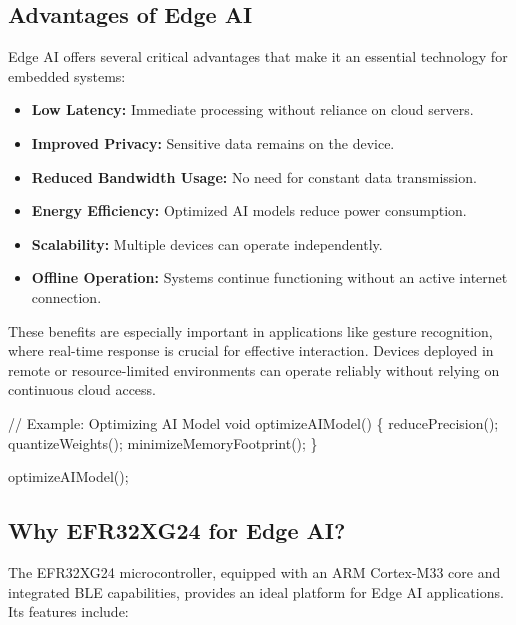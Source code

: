 \documentclass[
  9pt,
  letterpaper,
  abstract,
  titlepage]{scrbook}
\newenvironment{Shaded}{\begin{snugshade}}{\end{snugshade}}
\newcommand{\CommentTok}[1]{\textcolor[rgb]{0.37,0.37,0.37}{#1}}
\newcommand{\DataTypeTok}[1]{\textcolor[rgb]{0.68,0.00,0.00}{#1}}
\newcommand{\NormalTok}[1]{\textcolor[rgb]{0.00,0.23,0.31}{#1}}
\newcommand{\OperatorTok}[1]{\textcolor[rgb]{0.37,0.37,0.37}{#1}}
\begin{document}
\subsection{Advantages of Edge AI}\label{advantages-of-edge-ai}

Edge AI offers several critical advantages that make it an essential
technology for embedded systems:

\begin{itemize}
\item
  \textbf{Low Latency:} Immediate processing without reliance on cloud
  servers.
\item
  \textbf{Improved Privacy:} Sensitive data remains on the device.
\item
  \textbf{Reduced Bandwidth Usage:} No need for constant data
  transmission.
\item
  \textbf{Energy Efficiency:} Optimized AI models reduce power
  consumption.
\item
  \textbf{Scalability:} Multiple devices can operate independently.
\item
  \textbf{Offline Operation:} Systems continue functioning without an
  active internet connection.
\end{itemize}

These benefits are especially important in applications like gesture
recognition, where real-time response is crucial for effective
interaction. Devices deployed in remote or resource-limited environments
can operate reliably without relying on continuous cloud access.

\begin{Shaded}
\begin{Highlighting}[]
\CommentTok{// Example: Optimizing AI Model}
\DataTypeTok{void}\NormalTok{ optimizeAIModel}\OperatorTok{()} \OperatorTok{\{}
\NormalTok{    reducePrecision}\OperatorTok{();}
\NormalTok{    quantizeWeights}\OperatorTok{();}
\NormalTok{    minimizeMemoryFootprint}\OperatorTok{();}
\OperatorTok{\}}

\NormalTok{optimizeAIModel}\OperatorTok{();}
\end{Highlighting}
\end{Shaded}

\subsection{Why EFR32XG24 for Edge AI?}\label{why-efr32xg24-for-edge-ai}

The EFR32XG24 microcontroller, equipped with an ARM Cortex-M33 core and
integrated BLE capabilities, provides an ideal platform for Edge AI
applications. Its features include:
\end{document}
